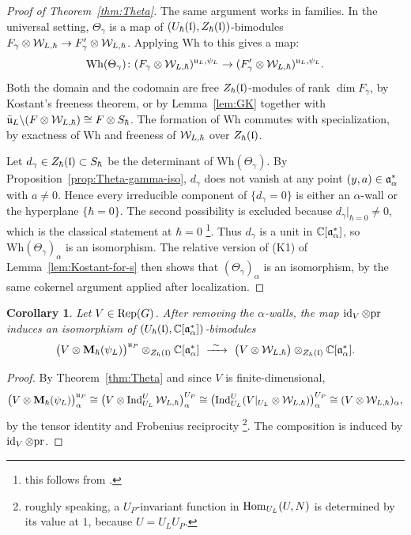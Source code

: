 \documentclass{article}
\theoremstyle{plain}
\newtheorem{corollary}[theorem]{Corollary}
\theoremstyle{definition}
\theoremstyle{remark}
\numberwithin{equation}{section}
\begin{document}
\begin{proof}[Proof of Theorem~\ref{thm:Theta}]
The same argument works in families. In the universal setting, $\Theta_\gamma$ is a map of $(U_\hbar(\mathfrak{l}),Z_\hbar(\mathfrak{l}))$-bimodules $F_\gamma\otimes\mathcal{W}_{L,\hbar}\to F'_\gamma\otimes\mathcal{W}_{L,\hbar}$. Applying $\mathrm{Wh}$ to this gives a map:
\[
\mathrm{Wh}(\Theta_\gamma)\colon(F_\gamma\otimes\mathcal{W}_{L,\hbar})^{\mathfrak{u}_L,\psi_L}\to(F'_\gamma\otimes\mathcal{W}_{L,\hbar})^{\mathfrak{u}_L,\psi_L}.
\]
Both the domain and the codomain are free $Z_\hbar(\mathfrak{l})$-modules of rank $\dim F_\gamma$, by Kostant's freeness theorem, or by Lemma~\ref{lem:GK} together with $\bar{\mathfrak{u}}_L\backslash(F\otimes\mathcal{W}_{L,\hbar})\cong F\otimes S_\hbar$. The formation of $\mathrm{Wh}$ commutes with specialization, by exactness of $\mathrm{Wh}$ and freeness of $\mathcal{W}_{L,\hbar}$ over $Z_\hbar(\mathfrak{l})$.

Let $d_\gamma\in Z_\hbar(\mathfrak{l})\subset S_\hbar$ be the determinant of $\mathrm{Wh}(\Theta_\gamma)$. By Proposition~\ref{prop:Theta-gamma-iso}, $d_\gamma$ does not vanish at any point $(y,a)\in\mathfrak{a}^*_{\alpha}$ with $a\neq0$. Hence every irreducible component of $\{d_\gamma=0\}$ is either an $\alpha$-wall or the hyperplane $\{\hbar=0\}$. The second possibility is excluded because $d_\gamma|_{\hbar=0}\neq0$, which is the classical statement at $\hbar=0$ \footnote{this follows from \cite[Proposition 3.4.12]{macerato2023leviequivariantrestrictionsphericalperverse}.}. Thus $d_\gamma$ is a unit in $\mathbb{C}[\mathfrak{a}^*_{\alpha}]$, so $\mathrm{Wh}(\Theta_\gamma)_\alpha$ is an isomorphism. The relative version of (K1) of Lemma~\ref{lem:Kostant-for-s} then shows that $(\Theta_\gamma)_\alpha$ is an isomorphism, by the same cokernel argument applied after localization.
\end{proof}

\begin{corollary}\label{cor:Theta-inv}
Let $V\in\operatorname{Rep}(G)$. After removing the $\alpha$-walls, the map $\operatorname{id}_V\otimes\mathrm{pr}$ induces an isomorphism of $(U_\hbar(\mathfrak{l}),\mathbb{C}[\mathfrak{a}^*_{\alpha}])$-bimodules
\begin{equation}\label{eq:step2}
\bigl(V\otimes\bM_\hbar(\psiL)\bigr)^{\fraku_P}\otimes_{\Zh(\frakl)}\Cal\ \xrightarrow{\ \sim\ }\ \bigl(V\otimes\calW_{L,\hbar}\bigr)\otimes_{\Zh(\frakl)}\Cal .
\end{equation}
\end{corollary}

\begin{proof}
By Theorem~\ref{thm:Theta} and since $V$ is finite-dimensional,
\[
\bigl(V\otimes\mathbf{M}_\hbar(\psi_L)\bigr)^{\mathfrak{u}_P}_\alpha\cong\bigl(V\otimes\operatorname{Ind}_{U_L}^U\mathcal{W}_{L,\hbar}\bigr)^{U_P}_\alpha\cong\bigl(\operatorname{Ind}_{U_L}^U(V|_{U_L}\otimes\mathcal{W}_{L,\hbar})\bigr)^{U_P}_\alpha\cong (V\otimes\mathcal{W}_{L,\hbar})_\alpha ,
\]
by the tensor identity and Frobenius reciprocity \footnote{roughly speaking, a $U_P$-invariant function in $\operatorname{Hom}_{U_L}(U,N)$ is determined by its value at $1$, because $U=U_LU_P$.}. The composition is induced by $\operatorname{id}_V\otimes\mathrm{pr}$.
\end{proof}
\end{document}
